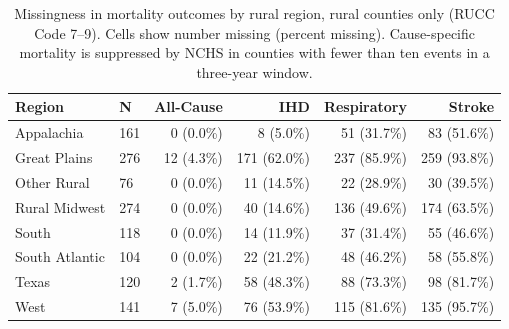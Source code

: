 \begin{table}[ht]
\centering
\small
\caption{Missingness in mortality outcomes by rural region, rural counties only (RUCC Code 7--9). Cells show number missing (percent missing). Cause-specific mortality is suppressed by NCHS in counties with fewer than ten events in a three-year window.}
\label{tab:mortality_missingness_by_region}
\begin{tabular}{llrrrr}
\toprule
Region & N & All-Cause & IHD & Respiratory & Stroke \\
\midrule
Appalachia & 161 & 0 (0.0\%) & 8 (5.0\%) & 51 (31.7\%) & 83 (51.6\%) \\
Great Plains & 276 & 12 (4.3\%) & 171 (62.0\%) & 237 (85.9\%) & 259 (93.8\%) \\
Other Rural & 76 & 0 (0.0\%) & 11 (14.5\%) & 22 (28.9\%) & 30 (39.5\%) \\
Rural Midwest & 274 & 0 (0.0\%) & 40 (14.6\%) & 136 (49.6\%) & 174 (63.5\%) \\
South & 118 & 0 (0.0\%) & 14 (11.9\%) & 37 (31.4\%) & 55 (46.6\%) \\
South Atlantic & 104 & 0 (0.0\%) & 22 (21.2\%) & 48 (46.2\%) & 58 (55.8\%) \\
Texas & 120 & 2 (1.7\%) & 58 (48.3\%) & 88 (73.3\%) & 98 (81.7\%) \\
West & 141 & 7 (5.0\%) & 76 (53.9\%) & 115 (81.6\%) & 135 (95.7\%) \\
\bottomrule
\end{tabular}
\end{table}
